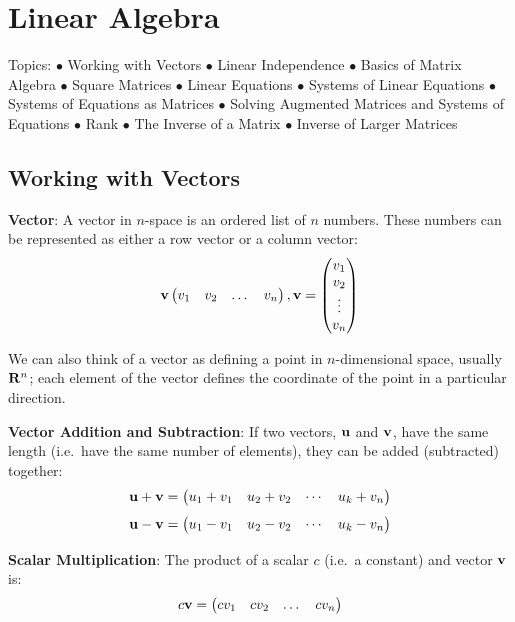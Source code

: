 \documentclass[
]{book}
\theoremstyle{definition}
\theoremstyle{definition}
\theoremstyle{definition}
\theoremstyle{remark}
\begin{document}
\hypertarget{linearalgebra}{%
\chapter{Linear Algebra}\label{linearalgebra}}

Topics:
\(\bullet\) Working with Vectors
\(\bullet\) Linear Independence
\(\bullet\) Basics of Matrix Algebra
\(\bullet\) Square Matrices
\(\bullet\) Linear Equations
\(\bullet\) Systems of Linear Equations
\(\bullet\) Systems of Equations as Matrices
\(\bullet\) Solving Augmented Matrices and Systems of Equations
\(\bullet\) Rank
\(\bullet\) The Inverse of a Matrix
\(\bullet\) Inverse of Larger Matrices

\hypertarget{vector-def}{%
\section{Working with Vectors}\label{vector-def}}

\textbf{Vector}: A vector in \(n\)-space is an ordered list of \(n\) numbers. These numbers can be represented as either a row vector or a column vector:
\[ {\bf v} \begin{pmatrix} v_1 & v_2 & \dots & v_n\end{pmatrix} , {\bf v} = \begin{pmatrix} v_1 \\ v_2 \\ \vdots \\ v_n \end{pmatrix}\]

We can also think of a vector as defining a point in \(n\)-dimensional space, usually \({\bf R}^n\); each element of the vector defines the coordinate of the point in a particular direction.

\textbf{Vector Addition and Subtraction}: If two vectors, \({\bf u}\) and \({\bf v}\), have the same length (i.e.~have the same number of elements), they can be added (subtracted) together:
\[ {\bf u} + {\bf v} = \begin{pmatrix} u_1 + v_1 & u_2 + v_2 & \cdots & u_k + v_n \end{pmatrix}\]
\[ {\bf u} - {\bf v} = \begin{pmatrix} u_1 - v_1 & u_2 - v_2 & \cdots & u_k - v_n \end{pmatrix}\]

\textbf{Scalar Multiplication}: The product of a scalar \(c\) (i.e.~a constant) and vector \({\bf v}\) is:\\
\[ c{\bf v} =  \begin{pmatrix} cv_1 & cv_2 & \dots & cv_n \end{pmatrix} \]
\end{document}
